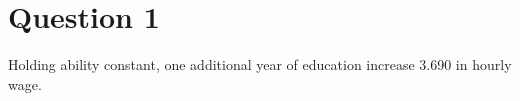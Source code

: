 \section*{Question 1}


Holding ability constant, one additional year of education increase 3.690 in hourly wage.
